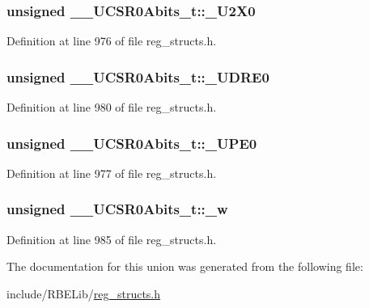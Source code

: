 \hypertarget{union_____u_c_s_r0_abits__t_a07bfe70996fd415a70a81e631d8faf44}{
\subsubsection[{\+\_\+\+U2\+X0}]{\setlength{\rightskip}{0pt plus 5cm}unsigned \+\_\+\+\_\+\+U\+C\+S\+R0\+Abits\+\_\+t\+::\+\_\+\+U2\+X0}}\label{union_____u_c_s_r0_abits__t_a07bfe70996fd415a70a81e631d8faf44}


Definition at line 976 of file reg\+\_\+structs.\+h.

\hypertarget{union_____u_c_s_r0_abits__t_a551657542abf11f95acd0b35fd94bb6d}{
\subsubsection[{\+\_\+\+U\+D\+R\+E0}]{\setlength{\rightskip}{0pt plus 5cm}unsigned \+\_\+\+\_\+\+U\+C\+S\+R0\+Abits\+\_\+t\+::\+\_\+\+U\+D\+R\+E0}}\label{union_____u_c_s_r0_abits__t_a551657542abf11f95acd0b35fd94bb6d}


Definition at line 980 of file reg\+\_\+structs.\+h.

\hypertarget{union_____u_c_s_r0_abits__t_a24651b56b5e2b20fae50767b04882a18}{
\subsubsection[{\+\_\+\+U\+P\+E0}]{\setlength{\rightskip}{0pt plus 5cm}unsigned \+\_\+\+\_\+\+U\+C\+S\+R0\+Abits\+\_\+t\+::\+\_\+\+U\+P\+E0}}\label{union_____u_c_s_r0_abits__t_a24651b56b5e2b20fae50767b04882a18}


Definition at line 977 of file reg\+\_\+structs.\+h.

\hypertarget{union_____u_c_s_r0_abits__t_ad6ad067a07dd1c95e32bd2c78b1737d7}{
\subsubsection[{\+\_\+w}]{\setlength{\rightskip}{0pt plus 5cm}unsigned \+\_\+\+\_\+\+U\+C\+S\+R0\+Abits\+\_\+t\+::\+\_\+w}}\label{union_____u_c_s_r0_abits__t_ad6ad067a07dd1c95e32bd2c78b1737d7}


Definition at line 985 of file reg\+\_\+structs.\+h.



The documentation for this union was generated from the following file\+:\begin{DoxyCompactItemize}
\item 
include/\+R\+B\+E\+Lib/\hyperlink{reg__structs_8h}{reg\+\_\+structs.\+h}\end{DoxyCompactItemize}
